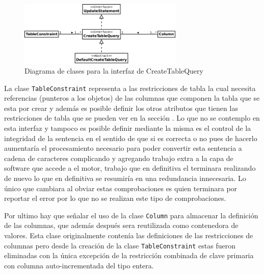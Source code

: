 \begin{figure}
  \centering
    \includegraphics[width=0.7\textwidth]{figuras/jdbgm-dc-createtable.png}
  \caption{Diagrama de clases para la interfaz de CreateTableQuery}
  \label{fig:dc-createtable}
\end{figure}


La clase \verb=TableConstraint= representa a las restricciones de tabla la cual necesita referencias (punteros a los objetos) de las columnas que componen la tabla que se esta por crear y además es posible definir los otros atributos que tienen las restricciones de tabla que se pueden ver en la sección  . Lo que no se contemplo en esta interfaz y tampoco es posible definir mediante la misma es el control de la integridad de la sentencia en el sentido de que si es correcta o no pues de hacerlo aumentaría el procesamiento necesario para poder convertir esta sentencia a cadena de caracteres complicando y agregando trabajo extra a la capa de software que accede a el motor, trabajo que en definitiva el terminara realizando de nuevo lo que en definitiva se resumiría en una redundancia innecesaria. Lo único que cambiara al obviar estas comprobaciones es quien terminara por reportar el error por lo que no se realizan este tipo de comprobaciones.

Por ultimo hay que señalar el uso de la clase \verb=Column= para almacenar la definición de las columnas, que además después sera reutilizada como contenedora de valores. Esta clase originalmente contenía las definiciones de las restricciones de columnas pero desde la creación de la clase \verb=TableConstraint= estas fueron eliminadas con la única excepción de la restricción combinada de clave primaria con columna  auto-incrementada del tipo entera.


